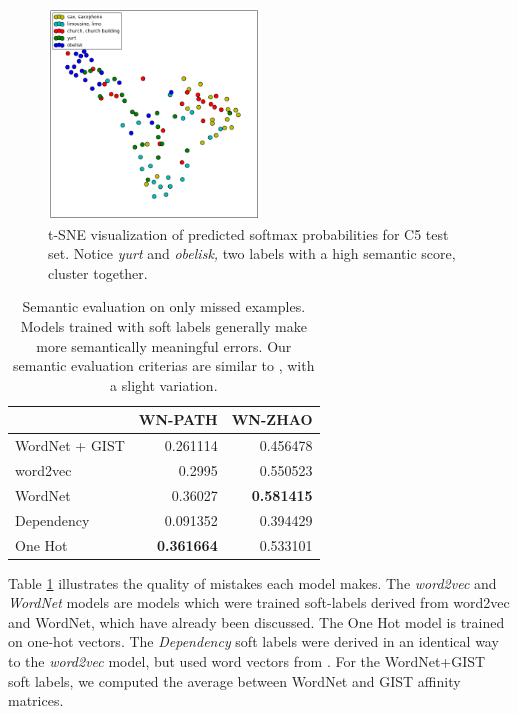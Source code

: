 \begin{figure}[!tb]
  \centering
  \includegraphics[width=0.5\textwidth]{figs/tsne.png}
  \caption{
      t-SNE visualization of predicted softmax probabilities for C5 test set.
      Notice \emph{yurt} and \emph{obelisk,} two labels with a high semantic
      score, cluster together.
  }
  \label{fig:tsne}
\end{figure}

\begin{table}[!tb]
    \centering
    \begin{tabular}{lrr}
         & WN-PATH & WN-ZHAO\\
        \hline
        WordNet + GIST & 0.261114 & 0.456478\\
        word2vec & 0.2995 & 0.550523\\
        WordNet & 0.36027 & \textbf{0.581415}\\
        Dependency & 0.091352 & 0.394429\\
        One Hot & \textbf{0.361664} & 0.533101\\
    \end{tabular}
  \caption{
      Semantic evaluation on only missed examples. Models trained
      with soft labels generally make more semantically meaningful errors. Our
      semantic evaluation criterias are similar to \cite{zhao2011large}, with a
      slight variation.
  }
  \label{tbl:semantic_misses}
\end{table}

Table \ref{tbl:semantic_misses} illustrates the quality of mistakes each model
makes. The \emph{word2vec} and \emph{WordNet} models are models which were
trained soft-labels derived from word2vec and WordNet, which have already been
discussed. The One Hot model is trained on one-hot vectors. The
\emph{Dependency} soft labels were derived in an identical way to the
\emph{word2vec} model, but used word vectors from \cite{levy2014dependency}.
For the WordNet+GIST soft labels, we computed the average between WordNet and
GIST affinity matrices.

